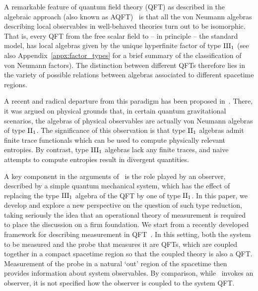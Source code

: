 \documentclass[sn-mathphys-num]{sn-jnl}%
\numberwithin{equation}{section}
\theoremstyle{thmstyleone}%
\theoremstyle{thmstyletwo}%
\theoremstyle{thmstylethree}%
\begin{document}
A remarkable feature of quantum field theory (QFT) as described in the algebraic approach (also known as AQFT)~\cite{Haag:book,HK,Araki81} is that all the von Neumann algebras describing local observables in well-behaved theories turn out to be isomorphic. That is, every QFT from the free scalar field to -- in principle -- the standard model, has local algebras given by the unique hyperfinite factor of type $\textnormal{III}_1$ \cite{fredenhagen1985modular,Haa87} (see also Appendix~\ref{appx:factor_types} for a brief summary of the classification of von Neumann factors). The distinction between different QFTs therefore lies in the variety of possible relations between algebras associated to different spacetime regions.

A recent and radical departure from this paradigm has been proposed in~\cite{chandrasekaran2023algebra}. There, it was argued on physical grounds that, in certain quantum gravitational scenarios, the algebras of physical observables are actually von Neumann algebras of type $\textnormal{II}_1$. The significance of this observation is that type $\textnormal{II}_1$ algebras admit finite trace functionals which can be used to compute physically relevant entropies. By contrast, type $\textnormal{III}_1$ algebras lack any finite traces, and naive attempts to compute entropies result in divergent quantities.

A key component in the arguments of~\cite{chandrasekaran2023algebra}
is the role played by an observer, described by a simple quantum mechanical system, which has the effect of replacing the type $\textnormal{III}_1$ algebra of the QFT by one of type $\textnormal{II}_1$. In this paper, we develop and explore a new perspective on the question of such type reduction, taking seriously the idea that an operational theory of measurement is required to place the discussion on a firm foundation. We start from a recently developed framework for describing measurement in QFT~\cite{FewVer_QFLM:2018,BostelmannFewsterRuep:2020,FewsterJubbRuep:2022,FewsterVerch_encyc:2023}. In this setting, both the system to be measured and the probe that measures it are QFTs, which are coupled together in a compact spacetime region so that the coupled theory is also a QFT. Measurement of the probe in a natural `out' region of the spacetime then provides information about system observables. By comparison, while~\cite{chandrasekaran2023algebra} invokes an observer, it is not specified how the observer is coupled to the system QFT.
\end{document}
